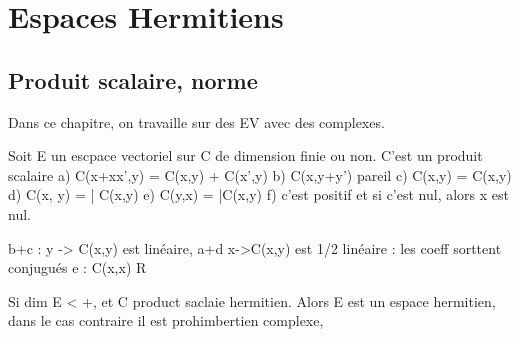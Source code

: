 \documentclass[french]{yLectureNote}
\begin{document}
\chapter{Espaces Hermitiens}
\section{Produit scalaire, norme}
Dans ce chapitre, on travaille sur des EV avec des complexes.
\begin{definition}
    Soit E un escpace vectoriel sur C de dimension finie ou non. C'est un produit scalaire \iff
    a) C(x+xx',y) = C(x,y) + C(x',y)
    b) C(x,y+y') pareil
    c) C(x,\lambda y) = \lambda C(x,y)
    d) C(\lambda x, y) = \bar{\lambda} C(x,y)
    e) C(y,x) = \bar{C(x,y)}
    f) c'est positif et si c'est nul, alors x est nul.
\end{definition}
b+c : y -> C(x,y) est linéaire, a+d x->C(x,y) est 1/2 linéaire : les coeff sorttent conjugués
e : C(x,x) \in R 
\begin{definition}
    Si dim E < +\infty, et C product saclaie hermitien. Alors E est un espace hermitien,  dans le cas contraire il est prohimbertien complexe,
\end{definition}
\end{document}
